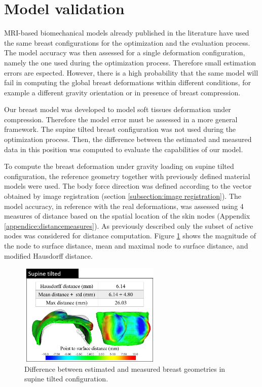 \section{Model validation}\label{chapter:modelvalidation}

MRI-based biomechanical models already published in the literature have used the same breast configurations for the optimization and the evaluation process. The model accuracy was then assessed for a single deformation configuration, namely the one used during the optimization process. Therefore small estimation errors are espected. However, there is a high probability that the same model will fail in computing the global breast deformations within different conditions, for example a different gravity orientation or in presence of breast compression. 

Our breast model was developed to model soft tissues deformation under compression. Therefore the model error must be assessed in a more general framework. The supine tilted breast configuration was not used during the optimization process. Then, the difference between the estimated and measured data in this position was computed to evaluate the capabilities of our model. 

To compute the breast deformation under gravity loading on supine tilted configuration, the reference geometry together with previously defined material models were used. The body force direction was defined according to the vector obtained by image registration (section \ref{subsection:image registration}). The model accuracy, in reference with the real deformations, was assessed using 4 measures of distance based on the spatial location of the skin nodes (Appendix \ref{appendice:distancemeasures}). As previously described only the subset of active nodes was considered for distance computation. Figure \ref{fig:modelevaluation} shows the magnitude of the node to surface distance, mean and maximal node to surface distance, and modified Hausdorff distance.
 
\begin{figure}[!h]
\centering
\includegraphics[width=0.6\textwidth,keepaspectratio]{figures/modelevaluation.png} 
\caption{Difference between estimated and measured breast geometries in supine tilted configuration.}\label{fig:modelevaluation}
\end{figure}

